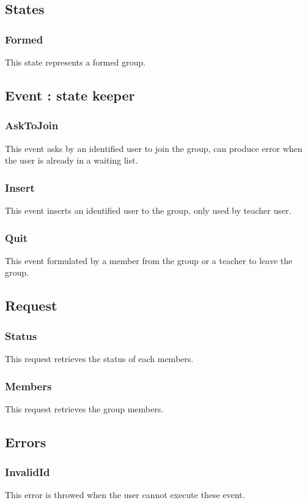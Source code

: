 	\subsection{States}
		\subsubsection{Formed}
			This state represents a formed group.
	\subsection{Event : state keeper}
		\subsubsection{AskToJoin}
			This event asks by an identified user to join the group, can produce error when the user is already in a waiting list.
		\subsubsection{Insert}
			This event inserts an identified user to the group, only used by teacher user.
		\subsubsection{Quit}
			This event formulated by a member from the group or a teacher to leave the group.
	\subsection{Request}
		\subsubsection{Status}
			This request retrieves the status of each members.
		\subsubsection{Members}
			This request retrieves the group members.
	\subsection{Errors}
		\subsubsection{InvalidId}
			This error is throwed when the user cannot execute these event.
\newpage
